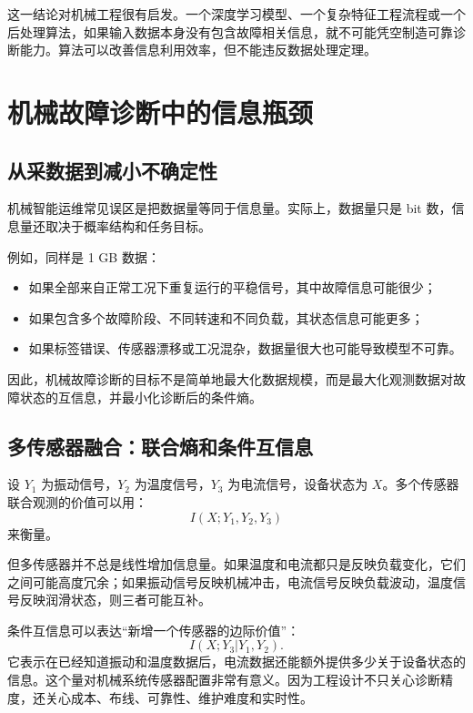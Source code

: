 \documentclass[UTF8,a4paper,12pt]{ctexart}
\begin{document}
这一结论对机械工程很有启发。一个深度学习模型、一个复杂特征工程流程或一个后处理算法，如果输入数据本身没有包含故障相关信息，就不可能凭空制造可靠诊断能力。算法可以改善信息利用效率，但不能违反数据处理定理。

\section{机械故障诊断中的信息瓶颈}

\subsection{从采数据到减小不确定性}

机械智能运维常见误区是把数据量等同于信息量。实际上，数据量只是 bit 数，信息量还取决于概率结构和任务目标。

例如，同样是 1 GB 数据：
\begin{itemize}
  \item 如果全部来自正常工况下重复运行的平稳信号，其中故障信息可能很少；
  \item 如果包含多个故障阶段、不同转速和不同负载，其状态信息可能更多；
  \item 如果标签错误、传感器漂移或工况混杂，数据量很大也可能导致模型不可靠。
\end{itemize}

因此，机械故障诊断的目标不是简单地最大化数据规模，而是最大化观测数据对故障状态的互信息，并最小化诊断后的条件熵。

\subsection{多传感器融合：联合熵和条件互信息}

设 $Y_1$ 为振动信号，$Y_2$ 为温度信号，$Y_3$ 为电流信号，设备状态为 $X$。多个传感器联合观测的价值可以用：
\begin{equation}
I(X;Y_1,Y_2,Y_3)
\end{equation}
来衡量。

但多传感器并不总是线性增加信息量。如果温度和电流都只是反映负载变化，它们之间可能高度冗余；如果振动信号反映机械冲击，电流信号反映负载波动，温度信号反映润滑状态，则三者可能互补。

条件互信息可以表达“新增一个传感器的边际价值”：
\begin{equation}
I(X;Y_3|Y_1,Y_2).
\end{equation}
它表示在已经知道振动和温度数据后，电流数据还能额外提供多少关于设备状态的信息。这个量对机械系统传感器配置非常有意义。因为工程设计不只关心诊断精度，还关心成本、布线、可靠性、维护难度和实时性。
\end{document}
